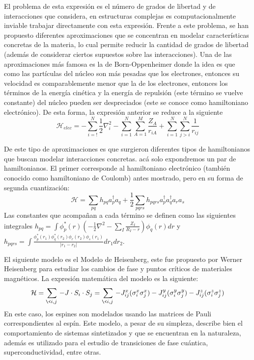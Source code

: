 El problema de esta expresión es el número de grados de libertad y de interacciones que considera, en estructuras complejas es computacionalmente inviable trabajar directamente con esta expresión. Frente a este problema, se han propuesto diferentes aproximaciones que se concentran en modelar características concretas de la materia, lo cual permite reducir la cantidad de grados de libertad (además de considerar ciertos supuestos sobre las interacciones). Una de las aproximaciones más famosa es la de Born-Oppenheimer\cite{BornOppenheimer} donde la idea es que como las partículas del núcleo son más pesadas que los electrones, entonces su velocidad es comparablemente menor que la de los electrones, entonces los términos de la energía cinética y la energía de repulsión (este término se vuelve constante) del núcleo pueden ser despreciados (este se conoce como hamiltoniano electrónico). De esta forma, la expresión anterior se reduce a la siguiente
\begin{equation*}
    \mathcal{H}_{elec} = -\sum_{i=!}^{N}\frac{1}{2}\nabla_i^2  -\sum_{i=1}^{N}\sum_{A = 1}^{M} \frac{Z_A}{r_{iA}} + \sum_{i=1}^{N}\sum_{j>i}^{N} \frac{1}{r_{ij}}
\end{equation*}

De este tipo de aproximaciones es que surgieron diferentes tipos de hamiltonianos que buscan modelar interacciones concretas. acá solo expondremos un par de hamiltonianos. El primer corresponde al hamiltoniano electrónico (también conocido como hamiltoniano de Coulomb) antes mostrado, pero en su forma de segunda cuantización\cite{szabo1996modern}:
\begin{equation}
    \mathcal{H} = \sum_{pq} h_{pq} a^{\dag}_{p} a_{q}  + \frac{1}{2} \sum_{pqrs}h_{pqrs} a^{\dag}_{p}a^{\dag}_{q} a_{r}a_{s}
    \label{eq:SCmolecular}
\end{equation}
Las constantes que acompañan a cada término se definen como las siguientes integrales $h_{pq} = \int \phi^{*}_p(r)(-\frac{1}{2} \nabla^{2} - \sum_I \frac{Z_I}{R_I-r})\phi_q(r) dr$ y $h_{pqrs} = \int \frac{\phi^{*}_p(r_1) \phi^{*}_q(r_2) \phi_r(r_2) \phi_s(r_1) }{|r_1 -r_2|} dr_1 dr_2$.


El siguiente modelo es el Modelo de Heisenberg\cite{Heisenberg1928}, este fue propuesto por Werner Heisenberg para estudiar los cambios de fase y puntos críticos de materiales magnéticos. La expresión matemática del modelo es la siguiente:
\begin{equation}
    \mathcal{H} = \sum_{\<i,j\>} -J \cdot S_i\cdot S_j = \sum_{\<i,j\>} -J^x_{ij}(\sigma^x_i\sigma^x_j) -J^y_{ij}(\sigma^y_i\sigma^y_j) -J^z_{ij}(\sigma^z_i\sigma^z_j)
    \label{eq:Heisenberg}
\end{equation}
En este caso, los espines son modelados usando las matrices de Pauli correspondientes al espín. Este modelo, a pesar de su simpleza, describe bien el comportamiento de sistemas sintetizados y que se encuentran en la naturaleza, además es utilizado para el estudio de transiciones de fase cuántica, superconductividad, entre otras\cite{IntroHeisenberg}. 

